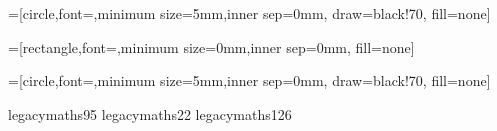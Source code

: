 =[circle,font=\small,minimum size=5mm,inner sep=0mm,
                                   draw=black!70,
                                    fill=none]

=[rectangle,font=\small,minimum size=0mm,inner sep=0mm,
                                    fill=none]

=[circle,font=\small,minimum size=5mm,inner sep=0mm,
                                   draw=black!70,
                                    fill=none]


\graphicspath{{../images/}}

\DeclareMathAccent{\dot}     {\mathalpha}{legacymaths}{95}
\DeclareMathAccent{\bar}     {\mathalpha}{legacymaths}{22}
\DeclareMathAccent{\tilde}     {\mathalpha}{legacymaths}{126}
